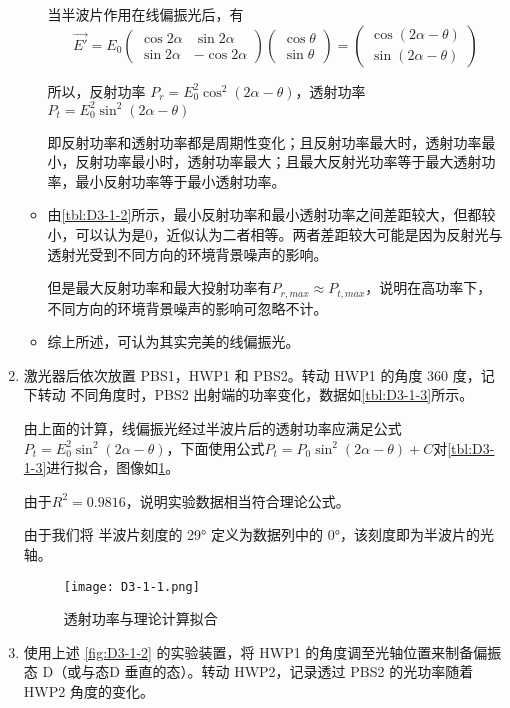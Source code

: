 \documentclass[dvipsnames, svgnames,a4paper,11pt]{article}
\begin{document}
\begin{enumerate}
\begin{itemize}
					当半波片作用在线偏振光后，有
					$$
						\vec{E'} = E_0 
						\begin{pmatrix}
							\cos2\alpha		&\sin2\alpha	\\
						   \sin2\alpha		&-\cos2\alpha
						\end{pmatrix}
						\begin{pmatrix}
							\cos\theta	\\
							\sin\theta
						\end{pmatrix} 
						= 
						\begin{pmatrix}
							\cos(2 \alpha - \theta)		\\
							\sin(2 \alpha - \theta)
						\end{pmatrix}
					$$

					所以，反射功率 $P_r = E_0^2 \cos^2(2 \alpha - \theta)$，透射功率 $P_t = E_0^2 \sin^2(2 \alpha - \theta)$

					即反射功率和透射功率都是周期性变化；且反射功率最大时，透射功率最小，反射功率最小时，透射功率最大；且最大反射光功率等于最大透射功率，最小反射功率等于最小透射功率。

					\item 由\cref{tbl:D3-1-2}所示，最小反射功率和最小透射功率之间差距较大，但都较小，可以认为是0，近似认为二者相等。两者差距较大可能是因为反射光与透射光受到不同方向的环境背景噪声的影响。
					
					但是最大反射功率和最大投射功率有$ P_{r,max} \approx P_{t,max} $，说明在高功率下，不同方向的环境背景噪声的影响可忽略不计。

					\item 综上所述，可认为其实完美的线偏振光。

				\end{itemize}

			
			\item 激光器后依次放置 PBS1，HWP1 和 PBS2。转动 HWP1 的角度 360 度，记下转动
			不同角度时，PBS2 出射端的功率变化，数据如\cref{tbl:D3-1-3}所示。

			由上面的计算，线偏振光经过半波片后的透射功率应满足公式 $P_t = E_0^2 \sin^2(2 \alpha - \theta)$，下面使用公式$ P_t = P_0 \sin^2(2\alpha - \theta) + C $对\cref{tbl:D3-1-3}进行拟合，图像如\cref{fig:D3-1-1}。

			由于$R^2 = 0.9816$，说明实验数据相当符合理论公式。

			由于我们将 半波片刻度的 29° 定义为数据列中的 0°，该刻度即为半波片的光轴。

			\begin{figure}[H]
				\centering
				\texttt{[image: D3-1-1.png]}
				\caption{透射功率与理论计算拟合}
				\label{fig:D3-1-1}
			\end{figure}



			\item 使用上述 \cref{fig:D3-1-2} 的实验装置，将 HWP1 的角度调至光轴位置来制备偏振态 D（或与态D 垂直的态）。转动 HWP2，记录透过 PBS2 的光功率随着 HWP2 角度的变化。
			
		\end{enumerate}
\end{document}
